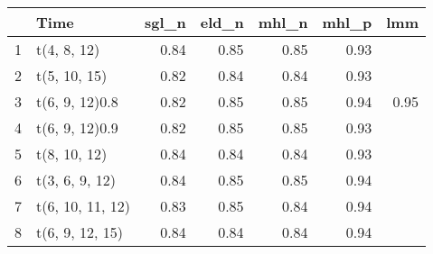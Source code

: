 \begin{table}[ht]
\centering
\begin{tabular}{rlrrrrr}
  \hline
 & Time & sgl\_n & eld\_n & mhl\_n & mhl\_p & lmm \\ 
  \hline
1 & t(4, 8, 12) & 0.84 & 0.85 & 0.85 & 0.93 &  \\ 
  2 & t(5, 10, 15) & 0.82 & 0.84 & 0.84 & 0.93 &  \\ 
  3 & t(6, 9, 12)0.8 & 0.82 & 0.85 & 0.85 & 0.94 & 0.95 \\ 
  4 & t(6, 9, 12)0.9 & 0.82 & 0.85 & 0.85 & 0.93 &  \\ 
  5 & t(8, 10, 12) & 0.84 & 0.84 & 0.84 & 0.93 &  \\ 
  6 & t(3, 6, 9, 12) & 0.84 & 0.85 & 0.85 & 0.94 &  \\ 
  7 & t(6, 10, 11, 12) & 0.83 & 0.85 & 0.84 & 0.94 &  \\ 
  8 & t(6, 9, 12, 15) & 0.84 & 0.84 & 0.84 & 0.94 &  \\ 
   \hline
\end{tabular}
\end{table}
